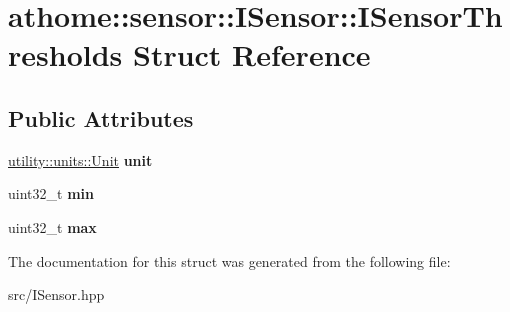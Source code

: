 \hypertarget{structathome_1_1sensor_1_1_i_sensor_1_1_i_sensor_thresholds}{}\section{athome\+:\+:sensor\+:\+:I\+Sensor\+:\+:I\+Sensor\+Thresholds Struct Reference}
\label{structathome_1_1sensor_1_1_i_sensor_1_1_i_sensor_thresholds}
\subsection*{Public Attributes}
\begin{DoxyCompactItemize}
\item 
\mbox{\label{structathome_1_1sensor_1_1_i_sensor_1_1_i_sensor_thresholds_a14489c021cea49fd39052766083b3255}} 
\mbox{\hyperlink{structathome_1_1utility_1_1units_1_1_unit}{utility\+::units\+::\+Unit}} {\bfseries unit}
\item 
\mbox{\label{structathome_1_1sensor_1_1_i_sensor_1_1_i_sensor_thresholds_a2bed3181d271e07d6c6a51611e838362}} 
uint32\+\_\+t {\bfseries min}
\item 
\mbox{\label{structathome_1_1sensor_1_1_i_sensor_1_1_i_sensor_thresholds_af8911a22468fed64c40fee4451bcca8a}} 
uint32\+\_\+t {\bfseries max}
\end{DoxyCompactItemize}


The documentation for this struct was generated from the following file\+:\begin{DoxyCompactItemize}
\item 
src/I\+Sensor.\+hpp\end{DoxyCompactItemize}
